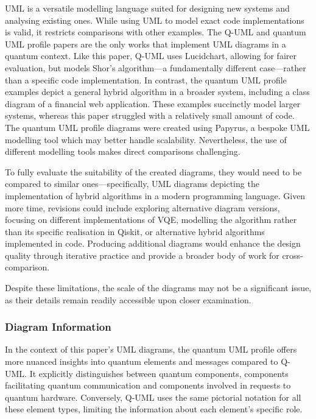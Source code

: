 \documentclass{article}
\begin{document}
UML is a versatile modelling language suited for designing new systems and analysing existing ones. While using UML to model exact code implementations is valid, it restricts comparisons with other examples. The Q-UML and quantum UML profile papers are the only works that implement UML diagrams in a quantum context. Like this paper, Q-UML uses Lucidchart, allowing for fairer evaluation, but models Shor's algorithm—a fundamentally different case—rather than a specific code implementation. In contrast, the quantum UML profile examples depict a general hybrid algorithm in a broader system, including a class diagram of a financial web application\cite{Pérez-Castillo2022}. These examples succinctly model larger systems, whereas this paper struggled with a relatively small amount of code. The quantum UML profile diagrams were created using Papyrus, a bespoke UML modelling tool which may better handle scalability. Nevertheless, the use of different modelling tools makes direct comparisons challenging.

To fully evaluate the suitability of the created diagrams, they would need to be compared to similar ones—specifically, UML diagrams depicting the implementation of hybrid algorithms in a modern programming language. Given more time, revisions could include exploring alternative diagram versions, focusing on different implementations of VQE, modelling the algorithm rather than its specific realisation in Qiskit, or alternative hybrid algorithms implemented in code. Producing additional diagrams would enhance the design quality through iterative practice and provide a broader body of work for cross-comparison.

Despite these limitations, the scale of the diagrams may not be a significant issue, as their details remain readily accessible upon closer examination.

\subsubsection{Diagram Information}

In the context of this paper's UML diagrams, the quantum UML profile offers more nuanced insights into quantum elements and messages compared to Q-UML. It explicitly distinguishes between quantum components, components facilitating quantum communication and components involved in requests to quantum hardware. Conversely, Q-UML uses the same pictorial notation for all these element types, limiting the information about each element's specific role.
\end{document}
